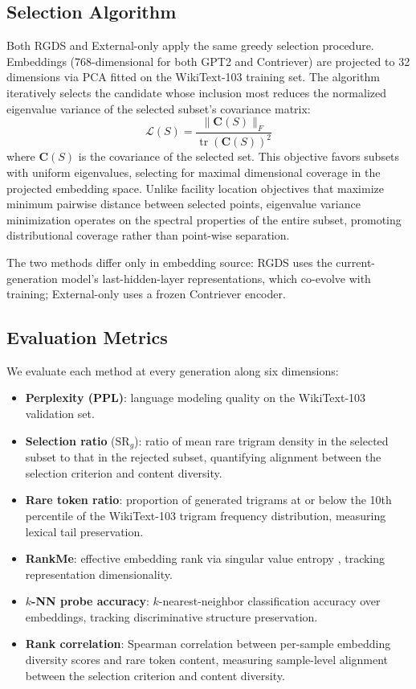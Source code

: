 \subsection{Selection Algorithm}

Both RGDS and External-only apply the same greedy selection procedure. Embeddings (768-dimensional for both GPT2 and Contriever) are projected to 32 dimensions via PCA fitted on the WikiText-103 training set. The algorithm iteratively selects the candidate whose inclusion most reduces the normalized eigenvalue variance of the selected subset's covariance matrix:
\begin{equation}
    \mathcal{L}(S) = \frac{\lVert \mathbf{C}(S) \rVert_F}{\operatorname{tr}(\mathbf{C}(S))^2}
\label{eq:selection_objective}
\end{equation}
where $\mathbf{C}(S)$ is the covariance of the selected set. This objective favors subsets with uniform eigenvalues, selecting for maximal dimensional coverage in the projected embedding space. Unlike facility location objectives that maximize minimum pairwise distance between selected points, eigenvalue variance minimization operates on the spectral properties of the entire subset, promoting distributional coverage rather than point-wise separation.

The two methods differ only in embedding source: RGDS uses the current-generation model's last-hidden-layer representations, which co-evolve with training; External-only uses a frozen Contriever encoder.

\subsection{Evaluation Metrics}

We evaluate each method at every generation along six dimensions:
\begin{itemize}
    \item \textbf{Perplexity (PPL)}: language modeling quality on the WikiText-103 validation set.
    \item \textbf{Selection ratio} ($\text{SR}_g$): ratio of mean rare trigram density in the selected subset to that in the rejected subset, quantifying alignment between the selection criterion and content diversity.
    \item \textbf{Rare token ratio}: proportion of generated trigrams at or below the 10th percentile of the WikiText-103 trigram frequency distribution, measuring lexical tail preservation.
    \item \textbf{RankMe}: effective embedding rank via singular value entropy \citep{garrido2023rankme}, tracking representation dimensionality.
    \item \textbf{$k$-NN probe accuracy}: $k$-nearest-neighbor classification accuracy over embeddings, tracking discriminative structure preservation.
    \item \textbf{Rank correlation}: Spearman correlation between per-sample embedding diversity scores and rare token content, measuring sample-level alignment between the selection criterion and content diversity.
\end{itemize}

